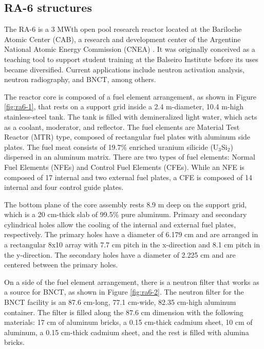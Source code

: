 \subsection{RA-6 structures}

The RA-6 is a 3 MWth open pool research reactor located at the Bariloche Atomic Center (CAB), a research and development center of the Argentine National Atomic Energy Commission (CNEA) \cite{ICSBEP}.
It was originally conceived as a teaching tool to support student training at the Balseiro Institute before its uses became diversified.
Current applications include neutron activation analysis, neutron radiography, and \gls*{BNCT}, among others.

The reactor core is composed of a fuel element arrangement, as shown in Figure \ref{fig:ra6-1}, that rests on a support grid inside a 2.4 m-diameter, 10.4 m-high stainless-steel tank.
The tank is filled with demineralized light water, which acts as a coolant, moderator, and reflector.
The fuel elements are Material Test Reactor (MTR) type, composed of rectangular fuel plates with aluminum side plates.
The fuel meat consists of 19.7\% enriched uranium silicide (U$_3$Si$_2$) dispersed in an aluminum matrix.
There are two types of fuel elements: Normal Fuel Elements (NFEs) and Control Fuel Elements (CFEs).
While an NFE is composed of 17 internal and two external fuel plates, a CFE is composed of 14 internal and four control guide plates.

The bottom plane of the core assembly rests 8.9 m deep on the support grid, which is a 20 cm-thick slab of 99.5\% pure aluminum.
Primary and secondary cylindrical holes allow the cooling of the internal and external fuel plates, respectively.
The primary holes have a diameter of 6.179 cm and are arranged in a rectangular 8x10 array with 7.7 cm pitch in the x-direction and 8.1 cm pitch in the y-direction.
The secondary holes have a diameter of 2.225 cm and are centered between the primary holes.

On a side of the fuel element arrangement, there is a neutron filter that works as a source for \gls*{BNCT}, as shown in Figure \ref{fig:ra6-2}.
The neutron filter for the \gls*{BNCT} facility is an 87.6 cm-long, 77.1 cm-wide, 82.35 cm-high aluminum container.
The filter is filled along the 87.6 cm dimension with the following materials: 17 cm of aluminum bricks, a 0.15 cm-thick cadmium sheet, 10 cm of aluminum, a 0.15 cm-thick cadmium sheet, and the rest is filled with alumina bricks.

